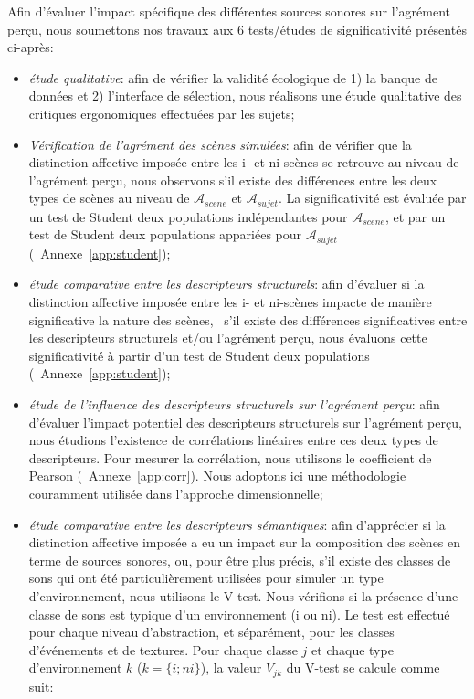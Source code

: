 Afin d'évaluer l'impact spécifique des différentes sources sonores sur l'agrément perçu, nous soumettons nos travaux aux 6 tests/études de significativité présentés ci-après:

\begin{itemize}
\item \emph{étude qualitative}: afin de vérifier la validité écologique de 1) la banque de données et 2) l'interface de sélection, nous réalisons une étude qualitative des critiques ergonomiques effectuées par les sujets;
\item \emph{Vérification de l'agrément des scènes simulées}: afin de vérifier que la distinction affective imposée entre les i- et ni-scènes se retrouve au niveau de l'agrément perçu, nous observons s'il existe des différences entre les deux types de scènes au niveau de $\mathcal{A}_{scene}$ et $\mathcal{A}_{sujet}$. La significativité est évaluée par un test de Student   deux populations indépendantes pour $\mathcal{A}_{scene}$, et par un test de Student   deux populations appariées pour $\mathcal{A}_{sujet}$ (\cf~Annexe~\ref{app:student});
\item \emph{étude comparative entre les descripteurs structurels}: afin d'évaluer si la distinction affective imposée entre les i- et ni-scènes impacte de manière significative la nature des scènes, \ie~s'il existe des différences significatives entre les descripteurs structurels et/ou l'agrément perçu, nous évaluons cette significativité à partir d'un test de Student   deux populations (\cf~Annexe~\ref{app:student});
\item \emph{étude de l'influence des descripteurs structurels sur l'agrément perçu}: afin d'évaluer l'impact potentiel des descripteurs structurels sur l'agrément perçu, nous étudions l'existence de corrélations linéaires entre ces deux types de descripteurs. Pour mesurer la corrélation, nous utilisons le coefficient de Pearson (\cf~Annexe~\ref{app:corr}). Nous adoptons ici une méthodologie couramment utilisée dans l'approche dimensionnelle;
\item \emph{étude comparative entre les descripteurs sémantiques}: afin d'apprécier si la distinction affective imposée a eu un impact sur la composition des scènes en terme de sources sonores, ou, pour être plus précis, s'il existe des classes de sons qui ont été particulièrement utilisées pour simuler un type d'environnement, nous utilisons le V-test. Nous vérifions si la présence d'une classe de sons est typique d'un environnement (i ou ni). Le test est effectué pour chaque niveau d'abstraction, et séparément, pour les classes d'événements et de textures. Pour chaque classe $j$ et chaque type d'environnement $k$ ($k=\lbrace i;ni\rbrace$), la valeur $V_{jk}$ du V-test se calcule comme suit: 


\end{itemize}
